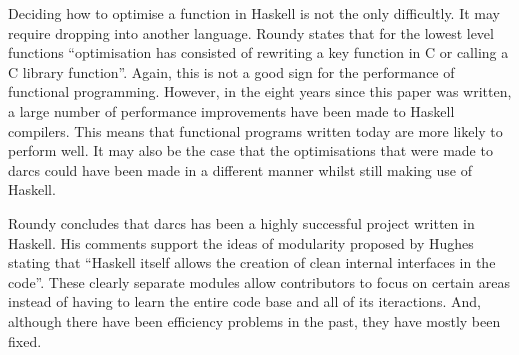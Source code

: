 Deciding how to optimise a function in Haskell is not the only difficultly. It
may require dropping into another language. Roundy states that for the lowest
level functions ``optimisation has consisted of rewriting a key function in C
or calling a C library function''. Again, this is not a good sign for the performance
of functional programming. However, in the eight years since this paper was
written, a large number of performance improvements have been made to Haskell
compilers. This means that functional programs written today are more likely
to perform well. It may also be the case that the optimisations that were made
to darcs could have been made in a different manner whilst still making use of
Haskell.

Roundy concludes that darcs has been a highly successful project written in
Haskell. His comments support the ideas of modularity proposed by Hughes stating
that ``Haskell itself allows the creation of clean internal interfaces in the
code''. These clearly separate modules allow contributors to focus on certain
areas instead of having to learn the entire code base and all of its iteractions.
And, although there have been efficiency problems in the past, they have mostly
been fixed.
